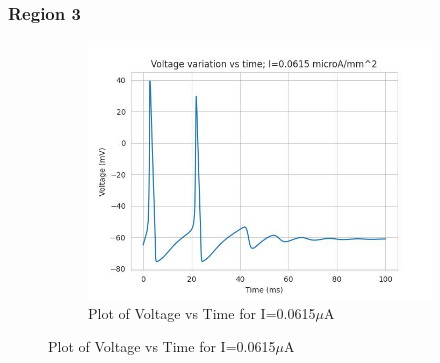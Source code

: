 \documentclass{article}
\begin{document}
\subsubsection{Region 3}

\begin{figure}[h]
    \centering
    \begin{subfigure}[b]{0.45\textwidth}
        \includegraphics[width=1.5\textwidth]{7.jpg}
        \caption{Plot of Voltage vs Time for I=0.0615$\mu$A}
        \label{fig:IOU1}
    \end{subfigure}
    

\end{figure}
\end{document}
